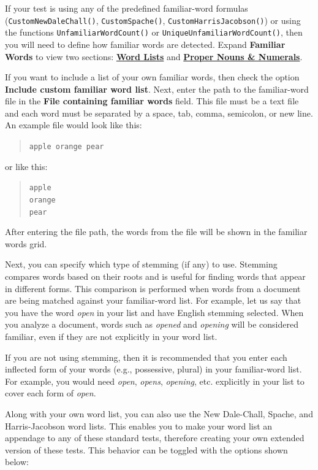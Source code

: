 \documentclass[
]{book}
\theoremstyle{definition}
\theoremstyle{definition}
\theoremstyle{definition}
\theoremstyle{definition}
\theoremstyle{remark}
\begin{document}
If your test is using any of the predefined familiar-word formulas (\texttt{CustomNewDaleChall()}, \texttt{CustomSpache()}, \texttt{CustomHarrisJacobson()}) or using the functions \texttt{UnfamiliarWordCount()} or \texttt{UniqueUnfamiliarWordCount()}, then you will need to define how familiar words are detected. Expand \textbf{Familiar Words} to view two sections: \protect\hyperlink{custom-word-list}{\textbf{Word Lists}} and \protect\hyperlink{custom-proper-numerals}{\textbf{Proper Nouns \& Numerals}}.

If you want to include a list of your own familiar words, then check the option \textbf{Include custom familiar word list}. Next, enter the path to the familiar-word file in the \textbf{File containing familiar words} field. This file must be a text file and each word must be separated by a space, tab, comma, semicolon, or new line. An example file would look like this:

\begin{quote}
\texttt{apple\ orange\ pear}
\end{quote}

or like this:

\begin{quote}
\texttt{apple}~\\
\texttt{orange}~\\
\texttt{pear}
\end{quote}

After entering the file path, the words from the file will be shown in the familiar words grid.

Next, you can specify which type of stemming (if any) to use. Stemming compares words based on their roots and is useful for finding words that appear in different forms. This comparison is performed when words from a document are being matched against your familiar-word list. For example, let us say that you have the word \emph{open} in your list and have English stemming selected. When you analyze a document, words such as \emph{opened} and \emph{opening} will be considered familiar, even if they are not explicitly in your word list.

If you are not using stemming, then it is recommended that you enter each inflected form of your words (e.g., possessive, plural) in your familiar-word list. For example, you would need \emph{open}, \emph{opens}, \emph{opening}, etc. explicitly in your list to cover each form of \emph{open}.

Along with your own word list, you can also use the New Dale-Chall, Spache, and Harris-Jacobson word lists. This enables you to make your word list an appendage to any of these standard tests, therefore creating your own extended version of these tests. This behavior can be toggled with the options shown below:
\end{document}
